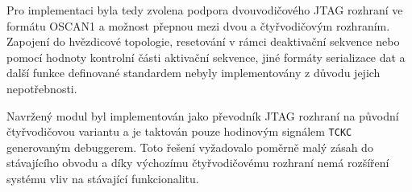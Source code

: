 Pro implementaci byla tedy zvolena podpora dvouvodičového \acs{JTAG} rozhraní ve formátu OSCAN1 a možnost přepnou mezi dvou a čtyřvodičovým rozhraním. Zapojení do hvězdicové topologie, resetování v rámci deaktivační sekvence nebo pomocí hodnoty kontrolní části aktivační sekvence, jiné formáty serializace dat a další funkce definované standardem nebyly implementovány z důvodu jejich nepotřebnosti. \cite{IEEE_1149-7}

Navržený modul byl implementován jako převodník \acs{JTAG} rozhraní na původní čtyřvodičovou variantu a je taktován pouze hodinovým signálem \texttt{\acs{TCKC}} generovaným debuggerem. Toto řešení vyžadovalo poměrně malý zásah do stávajícího obvodu a díky výchozímu čtyřvodičovému rozhraní nemá rozšíření systému vliv na stávající funkcionalitu.